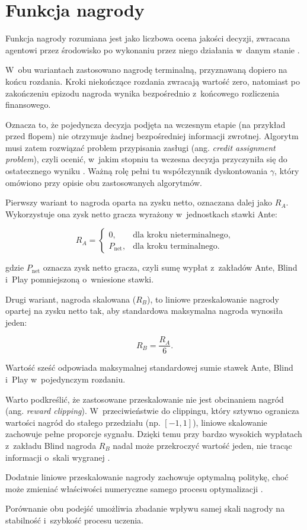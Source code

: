\section{Funkcja nagrody}
\label{sec:reward-functions}
Funkcja nagrody rozumiana jest jako liczbowa ocena jakości decyzji, zwracana
agentowi przez środowisko po wykonaniu przez niego działania w~danym stanie
\cite{reward_representation}.

W~obu wariantach zastosowano nagrodę terminalną, przyznawaną dopiero na końcu rozdania. Kroki
niekończące rozdania zwracają wartość zero, natomiast po zakończeniu
epizodu nagroda wynika bezpośrednio z~końcowego rozliczenia finansowego. 

Oznacza to, że pojedyncza decyzja podjęta na wczesnym etapie (na przykład przed
flopem) nie otrzymuje żadnej bezpośredniej informacji zwrotnej.
Algorytm musi zatem rozwiązać problem przypisania zasługi (ang.
\emph{credit assignment problem}), czyli ocenić, w~jakim stopniu ta wczesna
decyzja przyczyniła się do ostatecznego wyniku \cite{credit_assignment_problem}.
Ważną rolę pełni tu współczynnik dyskontowania $\gamma$, który omówiono przy
opisie obu zastosowanych algorytmów.

Pierwszy wariant to nagroda oparta na zysku netto, oznaczana dalej jako
$R_A$. Wykorzystuje ona zysk netto gracza wyrażony
w~jednostkach stawki Ante:

\begin{equation}
    R_A =
    \begin{cases}
        0, & \text{dla kroku nieterminalnego}, \\
        P_{\mathrm{net}}, & \text{dla kroku terminalnego}.
    \end{cases}
\end{equation}

gdzie $P_{\mathrm{net}}$ oznacza zysk netto gracza, czyli sumę wypłat
z~zakładów Ante, Blind i~Play pomniejszoną o~wniesione stawki.

Drugi wariant, nagroda skalowana ($R_B$), to liniowe przeskalowanie nagrody opartej na zysku netto tak, aby standardowa maksymalna nagroda wynosiła jeden:

\begin{equation}
    R_B = \frac{R_A}{6}.
\end{equation}

Wartość sześć odpowiada maksymalnej standardowej sumie stawek Ante, Blind i~Play w~pojedynczym rozdaniu. 

Warto podkreślić, że zastosowane przeskalowanie nie jest obcinaniem nagród (ang. \emph{reward clipping}). 
W~przeciwieństwie do clippingu, który sztywno ogranicza wartości nagród do stałego przedziału (np. $[-1, 1]$), 
liniowe skalowanie zachowuje pełne proporcje sygnału. Dzięki temu przy bardzo wysokich wypłatach z~zakładu 
Blind nagroda $R_B$ nadal może przekroczyć wartość jeden, nie tracąc informacji o~skali wygranej \cite{mnih_dqn_2015}.

Dodatnie liniowe przeskalowanie nagrody zachowuje optymalną politykę,
choć może zmieniać właściwości numeryczne samego procesu optymalizacji
\cite{ng_harada_russell_1999,miller_reward_shaping_notes}.

Porównanie obu podejść umożliwia zbadanie wpływu samej skali nagrody na stabilność i~szybkość procesu uczenia.